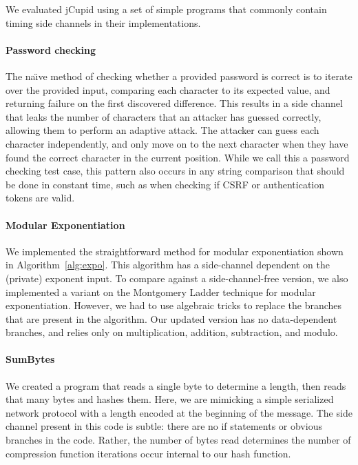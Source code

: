 

We evaluated jCupid using a set of simple programs that commonly contain timing
side channels in their implementations.


\paragraph{Password checking}
The na\"{\i}ve method of checking whether a provided password is correct is to iterate
over the provided input, comparing each character to its expected value, and
returning failure on the first discovered difference. This results in a side
channel that leaks the number of characters that an attacker has guessed
correctly, allowing them to perform an adaptive attack. The attacker can guess
each character independently, and only move on to the next character when they
have found the correct character in the current position. While we call this a
password checking test case, this pattern also occurs in any string comparison
that should be done in constant time, such as when checking if CSRF or
authentication tokens are valid.


\paragraph{Modular Exponentiation}
We implemented the straightforward method for modular exponentiation shown in
Algorithm~\ref{alg:expo}. This algorithm has a side-channel dependent on the
(private) exponent input. To compare against a side-channel-free version,
we also implemented a variant on the Montgomery Ladder
technique for modular exponentiation. However, we had to use algebraic tricks to
replace the branches that are present in the algorithm. Our updated version has no
data-dependent branches, and relies only on multiplication, addition,
subtraction, and modulo.


\paragraph{SumBytes}
We created a program that reads a single byte to determine a length, then reads
that many bytes and hashes them. Here, we are mimicking a simple serialized
network protocol with a length encoded at the beginning of the message. The side
channel present in this code is subtle: there are no if statements or obvious
branches in the code. Rather, the number of bytes read determines the number of
compression function iterations occur internal to our hash function.

